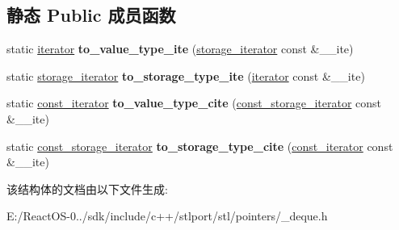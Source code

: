 \subsection*{静态 Public 成员函数}
\begin{DoxyCompactItemize}
\item 
\mbox{\label{struct___deque_ite_cast_a2481eab8fd6b0df01917ec7db7a82b32}} 
static \hyperlink{struct___deque__iterator}{iterator} {\bfseries to\+\_\+value\+\_\+type\+\_\+ite} (\hyperlink{struct___deque__iterator}{storage\+\_\+iterator} const \&\+\_\+\+\_\+ite)
\item 
\mbox{\label{struct___deque_ite_cast_af7459fa4d549807f9477064ff763ee06}} 
static \hyperlink{struct___deque__iterator}{storage\+\_\+iterator} {\bfseries to\+\_\+storage\+\_\+type\+\_\+ite} (\hyperlink{struct___deque__iterator}{iterator} const \&\+\_\+\+\_\+ite)
\item 
\mbox{\label{struct___deque_ite_cast_a476316a7c728e640d7cbf1ad4f07cfd7}} 
static \hyperlink{struct___deque__iterator}{const\+\_\+iterator} {\bfseries to\+\_\+value\+\_\+type\+\_\+cite} (\hyperlink{struct___deque__iterator}{const\+\_\+storage\+\_\+iterator} const \&\+\_\+\+\_\+ite)
\item 
\mbox{\label{struct___deque_ite_cast_a68bea74066b0ea403d8dc72c1a4799ff}} 
static \hyperlink{struct___deque__iterator}{const\+\_\+storage\+\_\+iterator} {\bfseries to\+\_\+storage\+\_\+type\+\_\+cite} (\hyperlink{struct___deque__iterator}{const\+\_\+iterator} const \&\+\_\+\+\_\+ite)
\end{DoxyCompactItemize}


该结构体的文档由以下文件生成\+:\begin{DoxyCompactItemize}
\item 
E\+:/\+React\+O\+S-\/0../sdk/include/c++/stlport/stl/pointers/\+\_\+deque.\+h\end{DoxyCompactItemize}
